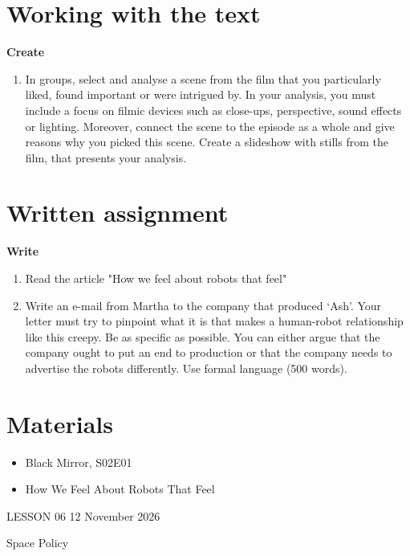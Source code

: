 \documentclass[11pt,a4paper,oneside]{book}
\newcommand{\tasktitle}[1]{{\color{blue}\bfseries #1}\par\smallskip}
\begin{document}
\section*{Working with the text}
\begin{taskbox}
\tasktitle{Create}
\begin{enumerate}
\item In groups, select and analyse a scene from the film that you particularly liked, found important or were intrigued by. In your analysis, you must include a focus on filmic devices such as close-ups, perspective, sound effects or lighting. Moreover, connect the scene to the episode as a whole and give reasons why you picked this scene. Create a slideshow with stills from the film, that presents your analysis.
\end{enumerate}
\end{taskbox}

\section*{Written assignment}
\begin{taskbox}
\tasktitle{Write}
\begin{enumerate}
\item Read the article "How we feel about robots that feel"
\item Write an e-mail from Martha to the company that produced ‘Ash’. Your letter must try to pinpoint what it is that makes a human-robot relationship like this creepy. Be as specific as possible. You can either argue that the company ought to put an end to production or that the company needs to advertise the robots differently. Use formal language (500 words).
\end{enumerate}
\end{taskbox}

\section*{Materials}

\begin{itemize}
\item Black Mirror, S02E01
\item How We Feel About Robots That Feel
\end{itemize}

\clearpage{}
{\color{blue}\small LESSON 06 \hfill 12 November 2026\par}
\vspace{4mm}
{\displayfont\color{navy}\fontsize{30}{34}\selectfont Space Policy\par}\vspace{4mm}
\end{document}
